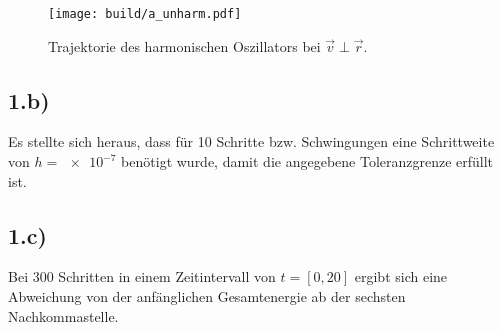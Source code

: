 \begin{figure}
  \centering
  \texttt{[image: build/a\_unharm.pdf]}
    \caption{Trajektorie des harmonischen Oszillators bei $\vec{v} \perp \vec{r}$.}
  \label{fig:unharm}
\end{figure}

\subsection*{1.b)}
Es stellte sich heraus, dass für 10 Schritte bzw. Schwingungen eine Schrittweite
von $h = \num{e-7}$ benötigt wurde, damit die angegebene Toleranzgrenze erfüllt
ist.

\subsection*{1.c)}
Bei 300 Schritten in einem Zeitintervall von $t = [0, 20]$ ergibt sich eine Abweichung
von der anfänglichen Gesamtenergie ab der sechsten Nachkommastelle.
